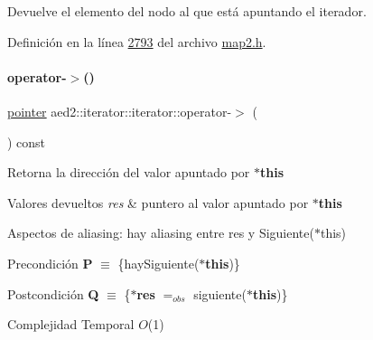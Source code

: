 Devuelve el elemento del nodo al que está apuntando el iterador. 

Definición en la línea \hyperlink{map2_8h_source_l02793}{2793} del archivo \hyperlink{map2_8h_source}{map2.\+h}.

\mbox{\label{classaed2_1_1iterator_1_1iterator_a9e9f5ca8d13a6945d6520736c0cc1a4f_a9e9f5ca8d13a6945d6520736c0cc1a4f}} 
\paragraph{\texorpdfstring{operator-\/$>$()}{operator->()}}
{\footnotesize\ttfamily \hyperlink{classaed2_1_1iterator_1_1iterator_add8c8243f6b0e3cb7b67ce06757df53b_add8c8243f6b0e3cb7b67ce06757df53b}{pointer} aed2\+::iterator\+::iterator\+::operator-\/$>$ (\begin{DoxyParamCaption}{ }\end{DoxyParamCaption}) const\hspace{0.3cm}{\ttfamily [inline]}}



Retorna la dirección del valor apuntado por {\bfseries $\ast$this} 


\begin{DoxyRetVals}{Valores devueltos}
{\em res} & puntero al valor apuntado por {\bfseries $\ast$this}\\
\hline
\end{DoxyRetVals}
\begin{DoxyParagraph}{Aspectos de aliasing\+:}
hay aliasing entre res y Siguiente($\ast$this)
\end{DoxyParagraph}
\begin{DoxyPrecond}{Precondición}
{\bfseries P} $\equiv$ \{hay\+Siguiente({\bfseries $\ast$this})\} 
\end{DoxyPrecond}
\begin{DoxyPostcond}{Postcondición}
{\bfseries Q} $\equiv$ \{{\bfseries $\ast$res} $=_{obs}$ siguiente({\bfseries $\ast$this})\}
\end{DoxyPostcond}

\begin{DoxyDescription}
\item[Complejidad Temporal]$O$(1)
\end{DoxyDescription}

